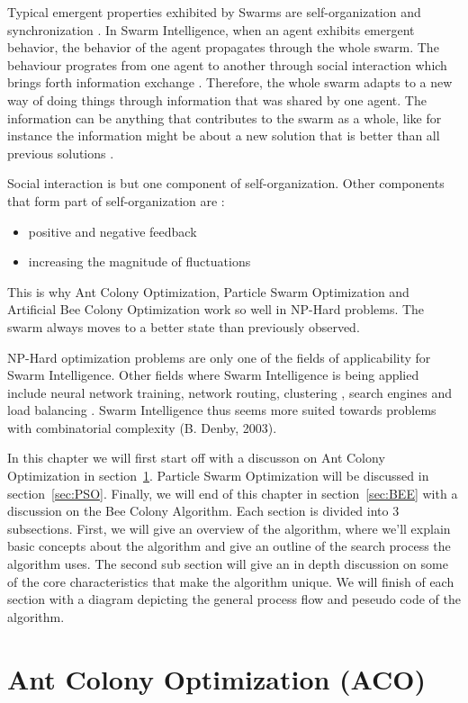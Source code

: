 Typical emergent properties exhibited by Swarms are self-organization and synchronization \cite{SwarmArt}. In Swarm Intelligence, when an agent exhibits emergent behavior, the behavior of the agent propagates through the whole swarm.  The behaviour progrates from one agent to another through social interaction which brings forth information exchange \cite{SwarmArt}. Therefore, the whole swarm adapts to a new way of doing things through information that was shared by one agent. The information can be anything that contributes to the swarm as a whole, like for instance the information might be about a new solution that is better than all previous solutions \cite{SwarmArt}. 

Social interaction is but one component of self-organization. Other components that form part of self-organization are \cite{SwarmArt}:
\begin{itemize}
\item positive and negative feedback
\item increasing the magnitude of fluctuations
\end{itemize}
This is why Ant Colony Optimization, Particle Swarm Optimization and Artificial Bee Colony Optimization work so well in NP-Hard problems. The swarm always moves to a better state than previously observed.

NP-Hard optimization problems are only one of the fields of applicability for Swarm Intelligence. Other fields where Swarm Intelligence is being applied include neural network training, network routing, clustering\cite{AntSwarmClustering} , search engines and load balancing \cite{}. Swarm Intelligence thus seems more suited towards problems with combinatorial complexity (B. Denby, 2003).

In this chapter we will first start off with a discusson on Ant Colony Optimization in section~\ref{sec:ACO}. Particle Swarm Optimization will be discussed in section~\ref{sec:PSO}. Finally, we will end of this chapter in section~\ref{sec:BEE} with a discussion on the Bee Colony Algorithm. Each section is divided into 3 subsections. First, we will give an overview of the algorithm, where we'll explain basic concepts about the algorithm and give an outline of the search process the algorithm uses. The second sub section will give an in depth discussion on some of the core characteristics that make the algorithm unique. We will finish of each section with a diagram depicting the general process flow and peseudo code of the algorithm.

\section{Ant Colony Optimization (ACO)}
\label{sec:ACO}
